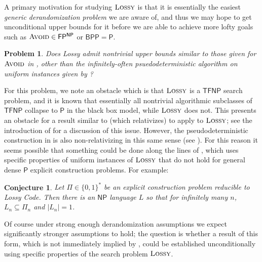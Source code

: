 \documentclass[11pt]{article}
\newtheorem{conjecture}{Conjecture}
\newtheorem{problem}{Problem}
\newcommand{\B}{\{0,1\}}
\newcommand{\avoid}{\textsc{Avoid}}
\newcommand{\lossy}{\textsc{Lossy}}
\begin{document}
A primary motivation for studying $\lossy$ is that it is essentially the easiest \emph{generic derandomization problem} we are aware of, and thus we may hope to get unconditional upper bounds for it before we are able to achieve more lofty goals such as $\avoid \in \mathsf{FP^{NP}}$ or $\mathsf{BPP} = \mathsf{P}$. 
\begin{problem}
Does Lossy admit nontrivial upper bounds similar to those given for $\avoid$ in \cite{Li,CHR}, other than the infinitely-often psuedodeterministic algorithm on uniform instances given by \cite{pseudo-primes}?
\end{problem}
For this problem, we note an obstacle which is that $\lossy$ is a $\mathsf{TFNP}$ search problem, and it is known that essentially all nontrivial algorithmic subclasses of $\mathsf{TFNP}$ collapse to $\mathsf{P}$ in the black box model, while $\lossy$ does not. This presents an obstacle for a result similar to \cite{Li} (which relativizes) to apply to $\lossy$; see the introduction of \cite{toni} for a discussion of this issue. However, the pseudodeterministic construction in \cite{pseudo-primes} is also non-relativizing in this same sense (see \cite{find1}). For this reason it seems possible that something could be done along the lines of \cite{pseudo-primes}, which uses specific properties of uniform instances of $\lossy$ that do not hold for general dense $\mathsf{P}$ explicit construction problems. For example:
\begin{conjecture}
Let $\Pi \in \B^*$ be an explicit construction problem reducible to Lossy Code. Then there is an $\mathsf{NP}$ language $L$ so that for infinitely many $n$, $L_n \subseteq \Pi_n$ and $|L_n|=1$.
\end{conjecture}
Of course under strong enough derandomization assumptions we expect significantly stronger assumptions to hold; the question is whether a result of this form, which is not immediately implied by \cite{pseudo-primes}, could be established unconditionally using specific properties of the search problem $\lossy$.




\end{document}
